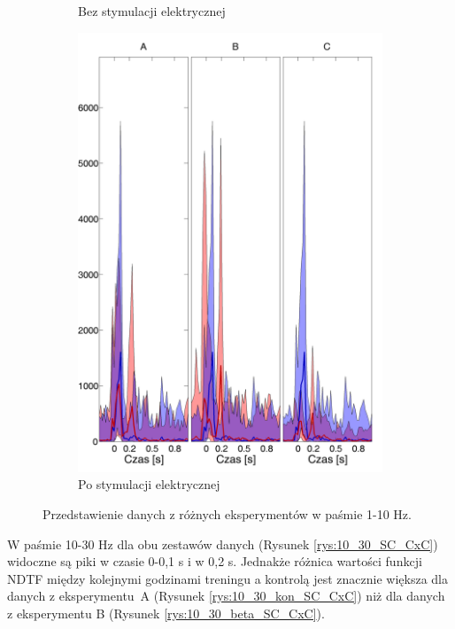 \documentclass{pracamgr_2}
\begin{document}
\begin{figure}[h]
\begin{subfigure}{.5\textwidth}
			\caption{Bez stymulacji elektrycznej}
			\label{rys:1_10_kon_SC_CxC}
		\end{subfigure}%
		\begin{subfigure}{.5\textwidth}
			\centering
			\includegraphics[width=1.\linewidth]{beta3_1-10_z_SC2_do_CxC82.png}
			\caption{Po stymulacji elektrycznej}
			\label{rys:1_10_beta_SC_CxC}
		\end{subfigure}
		\caption{Przedstawienie danych z różnych eksperymentów w paśmie 1-10 Hz.}
		\label{rys:1_10_SC_CxC}
	\end{figure}
	\FloatBarrier
	W paśmie 10-30 Hz dla obu zestawów danych (Rysunek \ref{rys:10_30_SC_CxC}) widoczne są piki w czasie 0-0,1 s i w 0,2 s. Jednakże różnica wartości funkcji NDTF między kolejnymi godzinami treningu a kontrolą jest znacznie większa dla danych z eksperymentu~A (Rysunek \ref{rys:10_30_kon_SC_CxC}) niż dla danych z eksperymentu B (Rysunek \ref{rys:10_30_beta_SC_CxC}).
\end{document}

